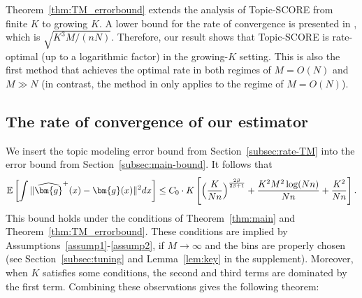 \documentclass[preprint,11pt]{article}
\newcommand{\mbb}{\mathbb}
\numberwithin{equation}{section}
\begin{document}
Theorem~\ref{thm:TM_errorbound} extends the analysis of Topic-SCORE from finite $K$  \citep{ke2024using, ke2024entry} to growing $K$. A lower bound for the rate of convergence is presented in \cite{bing2020fast}, which is  $\sqrt{K^3M/(nN)}$. 
Therefore, our result shows that Topic-SCORE is rate-optimal (up to a logarithmic factor) in the growing-$K$ setting. This is also the first method that achieves the optimal rate in both regimes of $M=O(N)$ and $M\gg N$ (in contrast, the method in \cite{bing2020fast} only applies to the regime of $M=O(N)$).  














\subsection{The rate of convergence of our estimator} \label{subsec:UB}
We insert the topic modeling error bound from Section~\ref{subsec:rate-TM} into the error bound from Section~\ref{subsec:main-bound}. It follows that 
\[
\mbb{E}\left[\int \|\widehat{\bm{g}}^+(x)-\bm{g}(x)\|^2dx\right]\le C_0 \cdot K \left[\Bigl(\frac{K}{Nn}\Bigr)^{\frac{2\beta}{2\beta+1}}+\frac{K^2M^2\log(Nn)}{Nn}  +  \frac{K^2}{Nn} \right]. 
\]
This bound holds under the conditions of Theorem~\ref{thm:main} and Theorem~\ref{thm:TM_errorbound}. 
These conditions are implied by Assumptions~\ref{assump1}-\ref{assump2}, 
if $M\to\infty$ and the bins are properly chosen (see Section~\ref{subsec:tuning} and Lemma~\ref{lem:key} in the supplement). 
Moreover, when $K$ satisfies some conditions, the second and third terms are dominated by the first term. Combining these observations gives the following theorem: 
\end{document}
